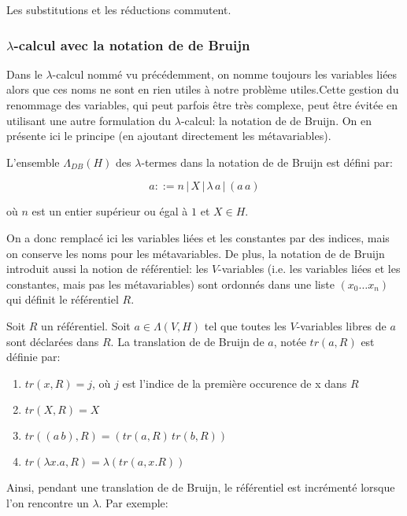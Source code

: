 \begin{prop}
Les substitutions et les réductions commutent.
\end{prop}

\subsubsection{$\lambda$-calcul avec la notation de de Bruijn}

Dans le $\lambda$-calcul nommé vu précédemment, on nomme toujours les variables liées alors que ces noms ne sont en rien utiles à notre problème utiles.Cette gestion du renommage des variables, qui peut parfois être très complexe, peut être évitée en utilisant une autre formulation du $\lambda$-calcul: la notation de de Bruijn. On en présente ici le principe (en ajoutant directement les métavariables).

\begin{defn}
L’ensemble $\Lambda_{DB}(H)$ des $\lambda$-termes dans la notation de de Bruijn est défini par:

\[ a::= n \, |\, X \,| \,\lambda \, a \,|\, (a \, a) \]

où $n$ est un entier supérieur ou égal à $1$ et $X \in H$.
\end{defn}

On a donc remplacé ici les variables liées et les constantes par des indices, mais on conserve les noms pour les métavariables. De plus, la notation de de Bruijn introduit aussi la notion de référentiel: les $V$-variables (i.e. les variables liées et les constantes, mais pas les métavariables) sont ordonnés dans une liste $(x_0 \dots x_n)$ qui définit le référentiel $R$.

\begin{defn}
Soit $R$ un référentiel. Soit $a \in \Lambda(V,H)$ tel que toutes les $V$-variables libres de $a$ sont déclarées dans $R$. La translation de de Bruijn de $a$, notée $tr(a,R)$ est définie par:
\begin{enumerate}
    \item $tr(x,R) = j$, où $j$ est l’indice de la première occurence de x dans $R$
    \item $tr(X,R) = X$
    \item $tr((a \, b),R) = (tr(a,R) \, tr(b,R))$
    \item $tr(\lambda x . a, R) = \lambda (tr(a, x . R))$
\end{enumerate}
\end{defn}

Ainsi, pendant une translation de de Bruijn, le référentiel est incrémenté lorsque l’on rencontre un $\lambda$. Par exemple:

